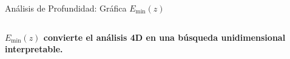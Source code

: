 \begin{frame}{Análisis de Profundidad: Gráfica $E_{\min}(z)$}
\begin{columns}[T]
    \end{columns}

    \vspace{0.15cm}
    \begin{center}
        \footnotesize
        \textbf{$E_{\min}(z)$ convierte el análisis 4D en una búsqueda unidimensional interpretable.}
    \end{center}

\end{frame}